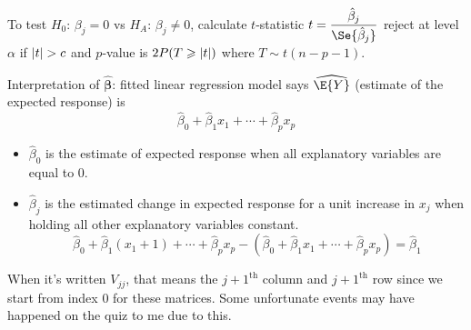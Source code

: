 To test $ H_0 $: $ \beta_j=0 $ vs $ H_A $: $ \beta_j\neq 0 $,
calculate $ t $-statistic
$ t=\dfrac{\hat{\beta}_j}{\Se{\hat{\beta}_j}} $
reject at level $ \alpha $ if $ \lvert t\rvert>c $ and
$ p $-value is $ 2P(T\geqslant \lvert t\rvert) $ where $ T \sim t(n-p-1) $.

Interpretation of $ \hat{\symbf{\beta}} $: fitted linear
regression model says $ \widehat{\E{Y}} $
(estimate of the expected response) is
\[ \hat{\beta}_0+\hat{\beta}_1x_1+\cdots+\hat{\beta}_p x_p \]
\begin{itemize}
    \item $ \hat{\beta}_0 $ is the estimate of expected response
          when all explanatory variables are equal to 0.
    \item $ \hat{\beta}_j $ is the estimated change
          in expected response for a unit increase in $ x_j $
          when holding all other explanatory variables constant.
          \[ \hat{\beta}_0+\hat{\beta}_1(x_1+1)+\cdots+\hat{\beta}_p x_p
              -(\hat{\beta}_0+\hat{\beta}_1 x_1+\cdots+\hat{\beta}_p x_p)=\hat{\beta}_1 \]
\end{itemize}

\begin{Remark}{}{}
    When it's written $ V_{jj} $, that means the $ j+1^{\text{th}} $
    column and $ j+1^{\text{th}} $ row since we start from index $ 0 $
    for these matrices. Some unfortunate events may have happened
    on the quiz to me due to this.
\end{Remark}
